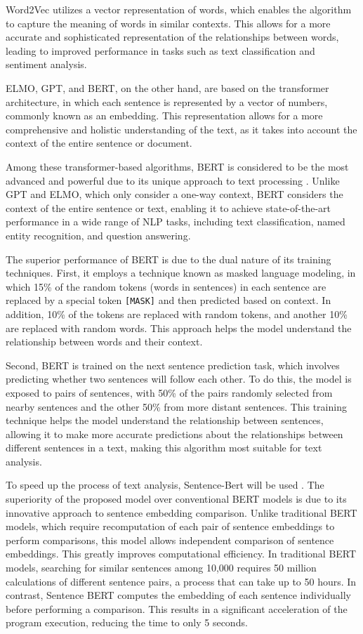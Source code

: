 \documentclass[PI]{ProjectProposal}
\begin{document}
Word2Vec utilizes a vector representation of words, which enables the algorithm to capture the meaning of words in similar contexts. This allows for a more accurate and sophisticated representation of the relationships between words, leading to improved performance in tasks such as text classification and sentiment analysis.

ELMO, GPT, and BERT, on the other hand, are based on the transformer architecture, in which each sentence is represented by a vector of numbers, commonly known as an embedding. This representation allows for a more comprehensive and holistic understanding of the text, as it takes into account the context of the entire sentence or document.

Among these transformer-based algorithms, BERT is considered to be the most advanced and powerful due to its unique approach to text processing \autocite{devlin2018bert}. Unlike GPT and ELMO, which only consider a one-way context, BERT considers the context of the entire sentence or text, enabling it to achieve state-of-the-art performance in a wide range of NLP tasks, including text classification, named entity recognition, and question answering.

The superior performance of BERT is due to the dual nature of its training techniques. First, it employs a technique known as masked language modeling, in which 15\% of the random tokens (words in sentences) in each sentence are replaced by a special token \texttt{[MASK]} and then predicted based on context. In addition, 10\% of the tokens are replaced with random tokens, and another 10\% are replaced with random words. This approach helps the model understand the relationship between words and their context.

Second, BERT is trained on the next sentence prediction task, which involves predicting whether two sentences will follow each other. To do this, the model is exposed to pairs of sentences, with 50\% of the pairs randomly selected from nearby sentences and the other 50\% from more distant sentences. This training technique helps the model understand the relationship between sentences, allowing it to make more accurate predictions about the relationships between different sentences in a text, making this algorithm most suitable for text analysis.

To speed up the process of text analysis, Sentence-Bert will be used \autocite{reimers-2019-sentence-bert}. The superiority of the proposed model over conventional BERT models is due to its innovative approach to sentence embedding comparison. Unlike traditional BERT models, which require recomputation of each pair of sentence embeddings to perform comparisons, this model allows independent comparison of sentence embeddings. This greatly improves computational efficiency. In traditional BERT models, searching for similar sentences among 10,000 requires 50 million calculations of different sentence pairs, a process that can take up to 50 hours. In contrast, Sentence BERT computes the embedding of each sentence individually before performing a comparison. This results in a significant acceleration of the program execution, reducing the time to only 5 seconds.
\end{document}
